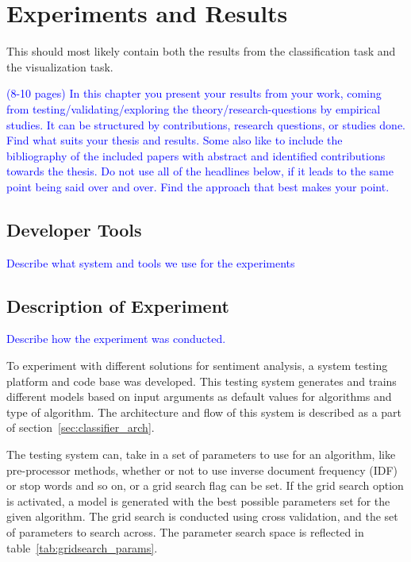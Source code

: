 \chapter{Experiments and Results}

This should most likely contain both the results from the classification task and the visualization task.

\textcolor{blue}{(8-10 pages) In this chapter you present your results from your work, coming from 
testing/validating/exploring the theory/research-questions by empirical studies. It can be structured by contributions, 
research questions, or studies done. Find what suits your thesis and results. Some also like to include the 
bibliography of the included papers with abstract and identified contributions towards the thesis. Do not use all of 
the headlines below, if it leads to the same point being said over and over. Find the approach that best makes your 
point.}

\section{Developer Tools}
\textcolor{blue}{Describe what system and tools we use for the experiments}


\section{Description of Experiment}
\textcolor{blue}{Describe how the experiment was conducted.}

To experiment with different solutions for sentiment analysis, a system testing platform and code base was developed. This testing system generates and trains different models based on input arguments as default values for algorithms and type of algorithm. The architecture and flow of this system is described as a part of section~\ref{sec:classifier_arch}.

The testing system can, take in a set of parameters to use for an algorithm, like pre-processor methods, whether or not to use inverse document frequency (IDF) or stop words and so on, or a grid search flag can be set. If the grid search option is activated, a model is generated with the best possible parameters set for the given algorithm. The grid search is conducted using cross validation, and the set of parameters to search across. The parameter search space is reflected in table~\ref{tab:gridsearch_params}.

